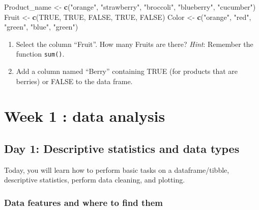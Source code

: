 \documentclass[
]{book}
\newenvironment{Shaded}{\begin{snugshade}}{\end{snugshade}}
\newcommand{\ConstantTok}[1]{\textcolor[rgb]{0.56,0.35,0.01}{#1}}
\newcommand{\FunctionTok}[1]{\textcolor[rgb]{0.13,0.29,0.53}{\textbf{#1}}}
\newcommand{\NormalTok}[1]{#1}
\newcommand{\OtherTok}[1]{\textcolor[rgb]{0.56,0.35,0.01}{#1}}
\newcommand{\StringTok}[1]{\textcolor[rgb]{0.31,0.60,0.02}{#1}}
\begin{document}
\begin{Shaded}
\begin{Highlighting}[]
\NormalTok{Product\_name }\OtherTok{\textless{}{-}} \FunctionTok{c}\NormalTok{(}\StringTok{"orange"}\NormalTok{, }\StringTok{"strawberry"}\NormalTok{, }\StringTok{"broccoli"}\NormalTok{, }\StringTok{"blueberry"}\NormalTok{, }\StringTok{"cucumber"}\NormalTok{)}
\NormalTok{Fruit }\OtherTok{\textless{}{-}} \FunctionTok{c}\NormalTok{(}\ConstantTok{TRUE}\NormalTok{, }\ConstantTok{TRUE}\NormalTok{, }\ConstantTok{FALSE}\NormalTok{, }\ConstantTok{TRUE}\NormalTok{, }\ConstantTok{FALSE}\NormalTok{)}
\NormalTok{Color }\OtherTok{\textless{}{-}} \FunctionTok{c}\NormalTok{(}\StringTok{"orange"}\NormalTok{, }\StringTok{"red"}\NormalTok{, }\StringTok{"green"}\NormalTok{, }\StringTok{"blue"}\NormalTok{, }\StringTok{"green"}\NormalTok{)}
\end{Highlighting}
\end{Shaded}

\begin{enumerate}
\def\labelenumi{\arabic{enumi}.}
\setcounter{enumi}{1}
\item
  Select the column ``Fruit''.
  How many Fruits are there?
  \emph{Hint}: Remember the function \texttt{sum()}.
\item
  Add a column named ``Berry'' containing TRUE (for products that are berries) or FALSE to the data frame.
\end{enumerate}

\hypertarget{week-1-data-analysis}{%
\chapter*{Week 1 : data analysis}\label{week-1-data-analysis}}

\hypertarget{day-1-descriptive-statistics-and-data-types}{%
\section*{Day 1: Descriptive statistics and data types}\label{day-1-descriptive-statistics-and-data-types}}

Today, you will learn how to perform basic tasks on a dataframe/tibble, descriptive statistics, perform data cleaning, and plotting.

\hypertarget{data-features-and-where-to-find-them}{%
\subsection{Data features and where to find them}\label{data-features-and-where-to-find-them}}
\end{document}
